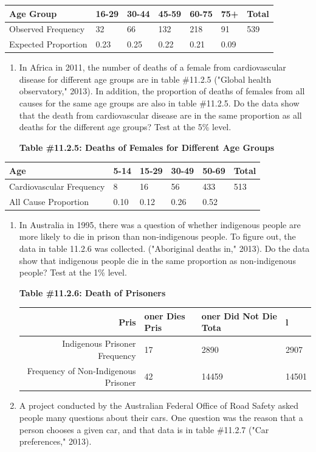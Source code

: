 \documentclass[]{book}
\begin{document}
\begin{longtable}[]{@{}lllllll@{}}
\toprule
Age Group & 16-29 & 30-44 & 45-59 & 60-75 & 75+ & Total\tabularnewline
\midrule
\endhead
Observed Frequency & 32 & 66 & 132 & 218 & 91 & 539\tabularnewline
Expected Proportion & 0.23 & 0.25 & 0.22 & 0.21 & 0.09 &\tabularnewline
\bottomrule
\end{longtable}

\begin{enumerate}
\def\labelenumi{\arabic{enumi}.}
\setcounter{enumi}{3}
\item
  In Africa in 2011, the number of deaths of a female from cardiovascular disease for different age groups are in table \#11.2.5 ("Global health observatory," 2013). In addition, the proportion of deaths of females from all causes for the same age groups are also in table \#11.2.5. Do the data show that the death from cardiovascular disease are in the same proportion as all deaths for the different age groups? Test at the 5\% level.

  \textbf{Table \#11.2.5: Deaths of Females for Different Age Groups}
\end{enumerate}

\begin{longtable}[]{@{}llllll@{}}
\toprule
Age & 5-14 & 15-29 & 30-49 & 50-69 & Total\tabularnewline
\midrule
\endhead
Cardiovascular Frequency & 8 & 16 & 56 & 433 & 513\tabularnewline
All Cause Proportion & 0.10 & 0.12 & 0.26 & 0.52 &\tabularnewline
\bottomrule
\end{longtable}

\begin{enumerate}
\def\labelenumi{\arabic{enumi}.}
\setcounter{enumi}{4}
\item
  In Australia in 1995, there was a question of whether indigenous people are more likely to die in prison than non-indigenous people. To figure out, the data in table 11.2.6 was collected. ("Aboriginal deaths in," 2013). Do the data show that indigenous people die in the same proportion as non-indigenous people? Test at the 1\% level.

  \textbf{Table \#11.2.6: Death of Prisoners}

  \begin{longtable}[]{@{}rlll@{}}
  \toprule
  Pris & oner Dies Pris & oner Did Not Die Tota & l\tabularnewline
  \midrule
  \endhead
  Indigenous Prisoner Frequency & 17 & 2890 & 2907\tabularnewline
  Frequency of Non-Indigenous Prisoner & 42 & 14459 & 14501\tabularnewline
  \bottomrule
  \end{longtable}
\item
  A project conducted by the Australian Federal Office of Road Safety asked people many questions about their cars. One question was the reason that a person chooses a given car, and that data is in table \#11.2.7 ("Car preferences," 2013).
\end{enumerate}
\end{document}
